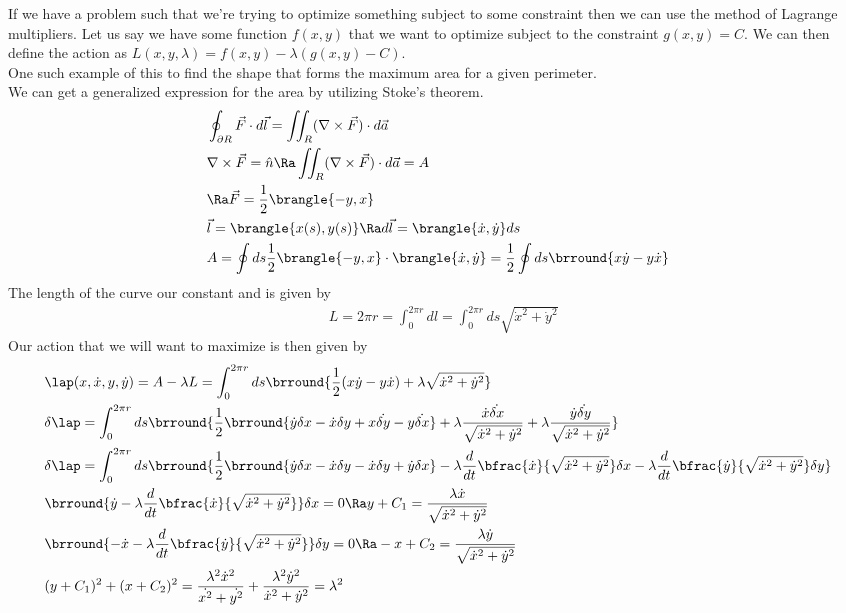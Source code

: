 If we have a problem such that we're trying to optimize something subject to some constraint then we can use the method of Lagrange multipliers. Let us say we have some function $f(x,y)$ that we want to optimize subject to the constraint $g(x,y)=C$. We can then define the action as $L(x,y,\lambda)=f(x,y)-\lambda(g(x,y)-C)$.\\
One such example of this to find the shape that forms the maximum area for a given perimeter.\\
We can get a generalized expression for the area by utilizing Stoke's theorem.
\begin{align*}
    &\oint_{\partial R}\vec{F}\cdot d\vec{l}=\iint_R(\nabla\times\vec{F})\cdot d\vec{a}\\
    &\nabla\times\vec{F}=\hat{n}\Ra \iint_R(\nabla\times\vec{F})\cdot d\vec{a}=A\\
    &\Ra \vec{F}=\frac{1}{2}\brangle{-y,x}\\
    &\vec{l}=\brangle{x(s),y(s)}\Ra d\vec{l}=\brangle{\dot{x},\dot{y}}ds\\
    &A=\oint ds\frac{1}{2}\brangle{-y,x}\cdot\brangle{\dot{x},\dot{y}}=\frac{1}{2}\oint ds\brround{x\dot{y}-y\dot{x}}
\end{align*}
The length of the curve our constant and is given by
\begin{align*}
    &L=2\pi r=\int_0^{2\pi r}dl=\int_0^{2\pi r}ds\sqrt{\dot{x}^2+\dot{y}^2}
\end{align*}
Our action that we will want to maximize is then given by
\begin{align*}
    &\lap(x,\dot{x},y,\dot{y})=A-\lambda L=\int_0^{2\pi r}ds\brround{\frac{1}{2}(x\dot{y}-y\dot{x})+\lambda\sqrt{\dot{x}^2+\dot{y}^2}}\\
    &\delta\lap=\int_0^{2\pi r}ds\brround{\frac{1}{2}\brround{\dot{y}\delta x-\dot{x}\delta y+x\dot{\delta y}-y\dot{\delta x}}+\lambda\frac{\dot{x}\dot{\delta x}}{\sqrt{\dot{x}^2+\dot{y}^2}}+\lambda\frac{\dot{y}\dot{\delta y}}{\sqrt{\dot{x}^2+\dot{y}^2}}}\\
    &\delta \lap=\int_0^{2\pi r}ds\brround{\frac{1}{2}\brround{\dot{y}\delta x-\dot{x}\delta y-\dot{x}\delta y+\dot{y}\delta x}-\lambda\frac{d}{dt}{\bfrac{\dot{x}}{\sqrt{\dot{x}^2+\dot{y}^2}}}\delta x-\lambda\frac{d}{dt}\bfrac{\dot{y}}{\sqrt{\dot{x}^2+\dot{y}^2}}\delta y}\\
    &\brround{\dot{y}-\lambda\frac{d}{dt}{\bfrac{\dot{x}}{\sqrt{\dot{x}^2+\dot{y}^2}}}}\delta x=0\Ra y+C_1=\frac{\lambda\dot{x}}{\sqrt{\dot{x}^2+\dot{y}^2}}\\
    &\brround{-\dot{x}-\lambda\frac{d}{dt}{\bfrac{\dot{y}}{\sqrt{\dot{x}^2+\dot{y}^2}}}}\delta y=0\Ra -x+C_2=\frac{\lambda\dot{y}}{\sqrt{\dot{x}^2+\dot{y}^2}}\\
    &(y+C_1)^2+(x+C_2)^2=\frac{\lambda^2\dot{x}^2}{\dot{x^2}+\dot{y^2}}+\frac{\lambda^2\dot{y}^2}{\dot{x}^2+\dot{y}^2}=\lambda^2
\end{align*}
